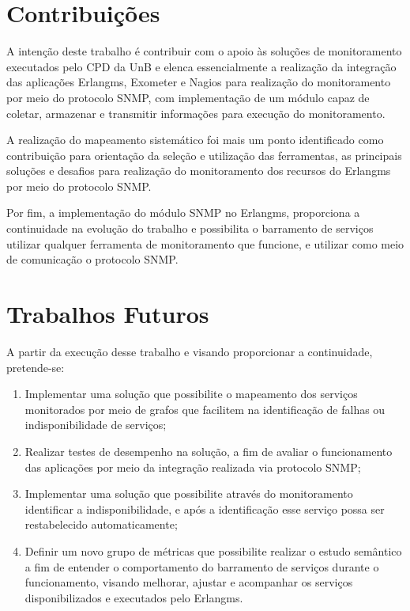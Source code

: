 \section{Contribuições}

A intenção deste trabalho é contribuir com o apoio às soluções de monitoramento executados pelo \acrshort{CPD} da \acrshort{UnB} e elenca essencialmente a realização da integração das aplicações Erlangms, Exometer e Nagios\textsuperscript{\textregistered} para realização do monitoramento por meio do protocolo \acrshort{SNMP}, com implementação de um módulo capaz de coletar, armazenar e transmitir informações para execução do monitoramento.

A realização do mapeamento sistemático foi mais um ponto identificado como contribuição para orientação da seleção e utilização das ferramentas, as principais soluções e desafios para realização do monitoramento dos recursos do Erlangms por meio do protocolo \acrshort{SNMP}.

Por fim, a implementação do módulo \acrshort{SNMP} no Erlangms, proporciona a continuidade na evolução do trabalho \cite{Agilar} e possibilita o barramento de serviços utilizar qualquer ferramenta de monitoramento que funcione, e utilizar como meio de comunicação o protocolo \acrshort{SNMP}.


\section{Trabalhos Futuros}

A partir da execução desse trabalho e visando proporcionar a continuidade, pretende-se:

\begin{enumerate}
    \item Implementar uma solução que possibilite o mapeamento dos serviços monitorados por meio de grafos que facilitem na identificação de falhas ou indisponibilidade de serviços;
    \item Realizar testes de desempenho na solução, a fim de avaliar o funcionamento das aplicações por meio da integração realizada via protocolo \acrshort{SNMP};
    \item Implementar uma solução que possibilite através do monitoramento identificar a indisponibilidade, e após a identificação esse serviço possa ser restabelecido automaticamente;
    \item Definir um novo grupo de métricas que possibilite realizar o estudo semântico a fim de entender o comportamento do barramento de serviços durante o funcionamento, visando melhorar, ajustar e acompanhar os serviços disponibilizados e executados pelo Erlangms.
\end{enumerate}

